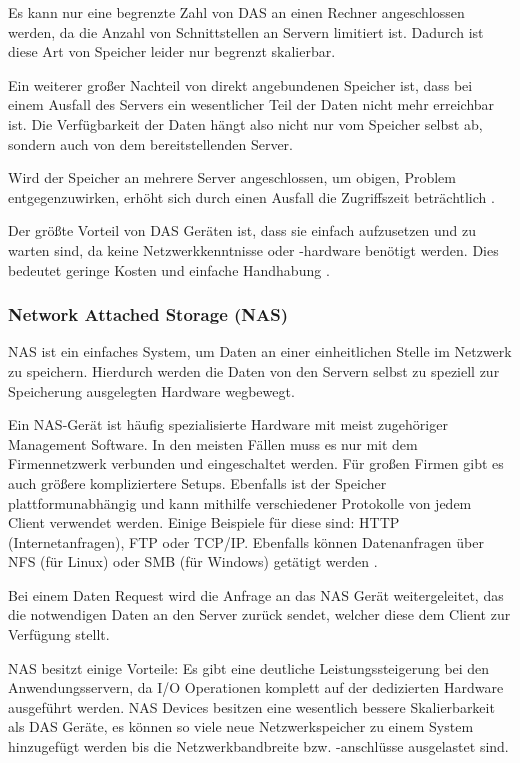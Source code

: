 Es kann nur eine begrenzte Zahl von \ac{DAS} an einen Rechner angeschlossen werden, da die Anzahl von Schnittstellen an Servern limitiert ist. Dadurch ist diese Art von Speicher leider nur begrenzt skalierbar.

Ein weiterer großer Nachteil von direkt angebundenen Speicher ist, dass bei einem Ausfall des Servers ein wesentlicher Teil der Daten nicht mehr erreichbar ist. Die Verfügbarkeit der Daten hängt also nicht nur vom Speicher selbst ab, sondern auch von dem bereitstellenden Server.

Wird der Speicher an mehrere Server angeschlossen, um obigen, Problem entgegenzuwirken, erhöht sich durch einen Ausfall die Zugriffszeit beträchtlich \parencite[Kap. 1, Disk Storage Systems]{gupta.2002}.

Der größte Vorteil von DAS Geräten ist, dass sie einfach aufzusetzen und zu warten sind, da keine Netzwerkkenntnisse oder -hardware benötigt werden. Dies bedeutet geringe Kosten und einfache Handhabung \parencite{beal.2017}.

\subsubsection{Network Attached Storage (NAS)}

\ac{NAS} ist ein einfaches System, um Daten an einer einheitlichen Stelle im Netzwerk zu speichern. Hierdurch werden die Daten von den Servern selbst zu speziell zur Speicherung ausgelegten Hardware wegbewegt. 

Ein NAS-Gerät ist häufig spezialisierte Hardware mit meist zugehöriger Management Software. In den meisten Fällen muss es nur mit dem Firmennetzwerk verbunden und eingeschaltet werden. Für großen Firmen gibt es auch größere kompliziertere Setups.
Ebenfalls ist der Speicher plattformunabhängig und kann mithilfe verschiedener Protokolle von jedem Client verwendet werden. Einige Beispiele für diese sind: HTTP (Internetanfragen), FTP oder TCP/IP. Ebenfalls können Datenanfragen über NFS (für Linux) oder SMB (für Windows) getätigt werden \parencite[Kap. 1, NAS Devices]{gupta.2002}.

Bei einem Daten Request wird die Anfrage an das NAS Gerät weitergeleitet, das die notwendigen Daten an den Server zurück sendet, welcher diese dem Client zur Verfügung stellt.

NAS besitzt einige Vorteile: Es gibt eine deutliche Leistungssteigerung bei den Anwendungsservern, da I/O Operationen komplett auf der dedizierten Hardware ausgeführt werden. NAS Devices besitzen eine wesentlich bessere Skalierbarkeit als \ac{DAS} Geräte, es können so viele neue Netzwerkspeicher zu einem System hinzugefügt werden bis die Netzwerkbandbreite bzw. -anschlüsse ausgelastet sind.

